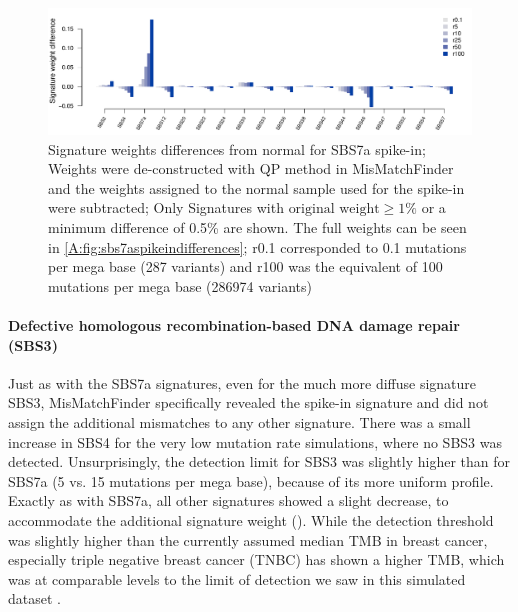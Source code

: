 \begin{figure}[ht]
\centering
\includegraphics[width=.99\linewidth]{Figures/MisMatchFinder/SBS7SpikeInSignatureDifferencesFocussed.pdf}
\caption[Signature weights differences from normal for SBS7a spike-in]{Signature weights differences from normal for SBS7a spike-in; Weights were de-constructed with QP method in MisMatchFinder and the weights assigned to the normal sample used for the spike-in were subtracted; Only Signatures with $\text{original weight}\geq 1\%$ or a minimum difference of 0.5\% are shown. The full weights can be seen in \protect\autoref{A:fig:sbs7aspikeindifferences}; r0.1 corresponded to 0.1 mutations per mega base (287 variants) and r100 was the equivalent of 100 mutations per mega base (286974 variants)}\label{fig:mmf-spikeSBS7asignatures}
\end{figure}

\paragraph{Defective homologous recombination-based DNA damage repair (SBS3)}
\label{mmf-sec:mbcSim}

Just as with the SBS7a signatures, even for the much more diffuse signature SBS3, MisMatchFinder specifically revealed the spike-in signature and did not assign the additional mismatches to any other signature. There was a small increase in SBS4 for the very low mutation rate simulations, where no SBS3 was detected. Unsurprisingly, the detection limit for SBS3 was slightly higher than for SBS7a (5 vs. 15 mutations per mega base), because of its more uniform profile. Exactly as with SBS7a, all other signatures showed a slight decrease, to accommodate the additional signature weight (). While the detection threshold was slightly higher than the currently assumed median TMB in breast cancer, especially triple negative breast cancer (TNBC) has shown a higher TMB, which was at comparable levels to the limit of detection we saw in this simulated dataset \cite{BarrosoSousa2020}.

